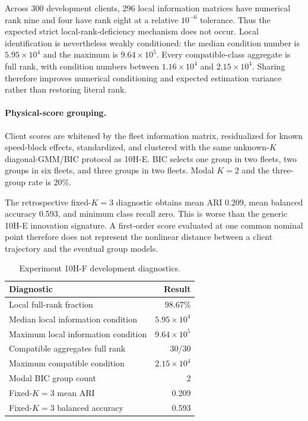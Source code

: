 Across 300 development clients, 296 local information matrices have numerical
rank nine and four have rank eight at a relative $10^{-6}$ tolerance. Thus the
expected strict local-rank-deficiency mechanism does not occur. Local
identification is nevertheless weakly conditioned: the median condition
number is $5.95\times10^4$ and the maximum is $9.64\times10^5$. Every
compatible-class aggregate is full rank, with condition numbers between
$1.16\times10^4$ and $2.15\times10^4$. Sharing therefore improves numerical
conditioning and expected estimation variance rather than restoring literal
rank.

\paragraph{Physical-score grouping.}
Client scores are whitened by the fleet information matrix, residualized for
known speed-block effects, standardized, and clustered with the same
unknown-$K$ diagonal-GMM/BIC protocol as 10H-E. BIC selects one group in two
fleets, two groups in six fleets, and three groups in two fleets. Modal $K=2$
and the three-group rate is 20\%.

The retrospective fixed-$K=3$ diagnostic obtains mean ARI 0.209, mean balanced
accuracy 0.593, and minimum class recall zero. This is worse than the generic
10H-E innovation signature. A first-order score evaluated at one common
nominal point therefore does not represent the nonlinear distance between a
client trajectory and the eventual group models.

\begin{table}[htbp]
\centering
\caption{Experiment 10H-F development diagnostics.}
\label{tab:experiment10hf}
\begin{tabular}{lr}
\toprule
Diagnostic & Result\\
\midrule
Local full-rank fraction & 98.67\%\\
Median local information condition & $5.95\times10^4$\\
Maximum local information condition & $9.64\times10^5$\\
Compatible aggregates full rank & 30/30\\
Maximum compatible condition & $2.15\times10^4$\\
Modal BIC group count & 2\\
Fixed-$K=3$ mean ARI & 0.209\\
Fixed-$K=3$ balanced accuracy & 0.593\\
\bottomrule
\end{tabular}
\end{table}

